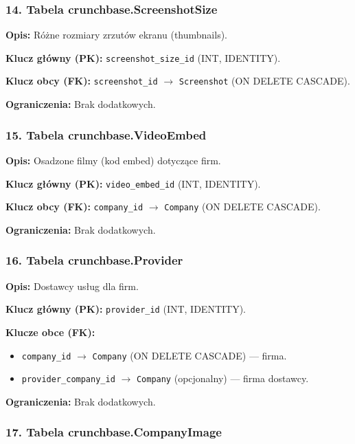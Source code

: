 \documentclass[12pt,a4paper]{article}
\begin{document}
\subsubsection{14. Tabela crunchbase.ScreenshotSize}

\textbf{Opis:} Różne rozmiary zrzutów ekranu (thumbnails).

\textbf{Klucz główny (PK):} \texttt{screenshot\_size\_id} (INT, IDENTITY).

\textbf{Klucz obcy (FK):} \texttt{screenshot\_id} $\rightarrow$ \texttt{Screenshot} (ON DELETE CASCADE).

\textbf{Ograniczenia:} Brak dodatkowych.

\subsubsection{15. Tabela crunchbase.VideoEmbed}

\textbf{Opis:} Osadzone filmy (kod embed) dotyczące firm.

\textbf{Klucz główny (PK):} \texttt{video\_embed\_id} (INT, IDENTITY).

\textbf{Klucz obcy (FK):} \texttt{company\_id} $\rightarrow$ \texttt{Company} (ON DELETE CASCADE).

\textbf{Ograniczenia:} Brak dodatkowych.

\subsubsection{16. Tabela crunchbase.Provider}

\textbf{Opis:} Dostawcy usług dla firm.

\textbf{Klucz główny (PK):} \texttt{provider\_id} (INT, IDENTITY).

\textbf{Klucze obce (FK):}
\begin{itemize}[noitemsep]
    \item \texttt{company\_id} $\rightarrow$ \texttt{Company} (ON DELETE CASCADE) --- firma.
    \item \texttt{provider\_company\_id} $\rightarrow$ \texttt{Company} (opcjonalny) --- firma dostawcy.
\end{itemize}

\textbf{Ograniczenia:} Brak dodatkowych.

\subsubsection{17. Tabela crunchbase.CompanyImage}
\end{document}

